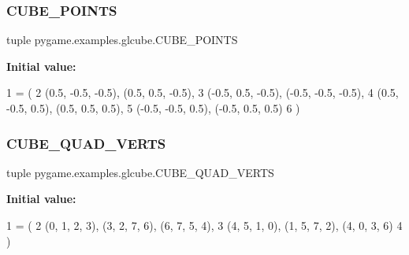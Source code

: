 \subsubsection{\texorpdfstring{C\+U\+B\+E\+\_\+\+P\+O\+I\+N\+TS}{CUBE\_POINTS}}
{\footnotesize\ttfamily tuple pygame.\+examples.\+glcube.\+C\+U\+B\+E\+\_\+\+P\+O\+I\+N\+TS}

{\bfseries Initial value\+:}
\begin{DoxyCode}
1 =  (
2     (0.5, -0.5, -0.5),  (0.5, 0.5, -0.5),
3     (-0.5, 0.5, -0.5),  (-0.5, -0.5, -0.5),
4     (0.5, -0.5, 0.5),   (0.5, 0.5, 0.5),
5     (-0.5, -0.5, 0.5),  (-0.5, 0.5, 0.5)
6 )
\end{DoxyCode}
\mbox{\label{namespacepygame_1_1examples_1_1glcube_adf6516e8f3ac7edce35104295f7a5d05}} 
\subsubsection{\texorpdfstring{C\+U\+B\+E\+\_\+\+Q\+U\+A\+D\+\_\+\+V\+E\+R\+TS}{CUBE\_QUAD\_VERTS}}
{\footnotesize\ttfamily tuple pygame.\+examples.\+glcube.\+C\+U\+B\+E\+\_\+\+Q\+U\+A\+D\+\_\+\+V\+E\+R\+TS}

{\bfseries Initial value\+:}
\begin{DoxyCode}
1 =  (
2     (0, 1, 2, 3), (3, 2, 7, 6), (6, 7, 5, 4),
3     (4, 5, 1, 0), (1, 5, 7, 2), (4, 0, 3, 6)
4 )
\end{DoxyCode}
